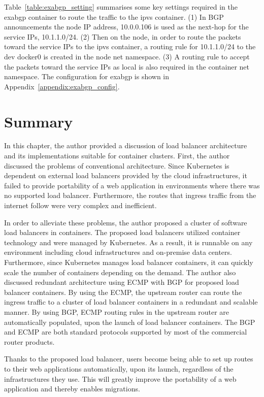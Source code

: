 Table~\ref{table:exabgp_setting} summarises some key settings required in the exabgp container to route the traffic to the ipvs container.
(1) In BGP announcements the node IP address, 10.0.0.106 is used as the next-hop for the service IPs, 10.1.1.0/24.
(2) Then on the node, in order to route the packets toward the service IPs to the ipvs container, 
a routing rule for 10.1.1.0/24 to the dev docker0 is created in the node net namespace. 
(3) A routing rule to accept the packets toward the service IPs as local is also required in the container net namespace. 
The configuration for exabgp is shown in Appendix~\ref{appendix:exabgp_config}.

\FloatBarrier


\section{Summary}

In this chapter, the author provided a discussion of load balancer architecture and its implementations suitable for container clusters.
%
First, the author discussed the problems of conventional architecture.
Since Kubernetes is dependent on external load balancers provided by the cloud infrastructures,
it failed to provide portability of a web application in environments where there was no supported load balancer.
Furthermore, the routes that ingress traffic from the internet follow were very complex and inefficient.

In order to alleviate these problems, the author proposed a cluster of software load balancers in containers.
The proposed load balancers utilized container technology and were managed by Kubernetes.
As a result, it is runnable on any environment including cloud infrastructures and on-premise data centers.
Furthermore, since Kubernetes manages load balancer containers, it can quickly scale the number of containers depending on the demand.
%
The author also discussed redundant architecture using ECMP with BGP for proposed load balancer containers.
By using the ECMP, the upstream router can route the ingress traffic to a cluster of load balancer containers in a redundant and scalable manner.
By using BGP, ECMP routing rules in the upstream router are automatically populated, upon the launch of load balancer containers.
The BGP and ECMP are both standard protocols supported by most of the commercial router products.

Thanks to the proposed load balancer, users become being able to set up routes to their web applications automatically, upon its launch, regardless of the infrastructures they use.  
This will greatly improve the portability of a web application and thereby enables migrations.




